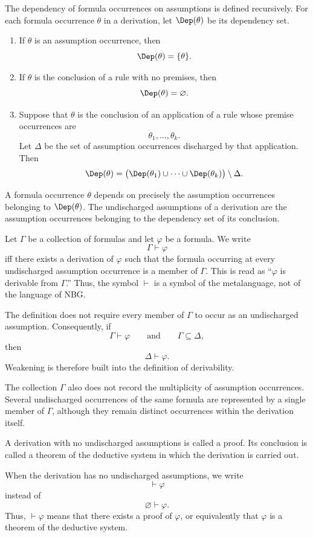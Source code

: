 The dependency of formula occurrences on assumptions is defined recursively. For each formula occurrence \(\theta\) in a derivation, let \(\Dep(\theta)\) be its dependency set.

\begin{enumerate}
    \item If \(\theta\) is an assumption occurrence, then
    \[
    \Dep(\theta)=\{\theta\}.
    \]

    \item If \(\theta\) is the conclusion of a rule with no premises, then
    \[
    \Dep(\theta)=\varnothing.
    \]

    \item Suppose that \(\theta\) is the conclusion of an application of a rule whose premise occurrences are
    \[
    \theta_1,\ldots,\theta_k.
    \]
    Let \(\Delta\) be the set of assumption occurrences discharged by that application. Then
    \[
    \Dep(\theta)
    =
    \bigl(
    \Dep(\theta_1)\cup\cdots\cup\Dep(\theta_k)
    \bigr)
    \setminus\Delta.
    \]
\end{enumerate}

A formula occurrence \(\theta\) depends on precisely the assumption occurrences belonging to \(\Dep(\theta)\). The undischarged assumptions of a derivation are the assumption occurrences belonging to the dependency set of its conclusion.

Let \(\Gamma\) be a collection of formulas and let \(\varphi\) be a formula. We write
\[
\Gamma\vdash\varphi
\]
iff there exists a derivation of \(\varphi\) such that the formula occurring at every undischarged assumption occurrence is a member of \(\Gamma\). This is read as ``\(\varphi\) is derivable from \(\Gamma\).'' Thus, the symbol \(\vdash\) is a symbol of the metalanguage, not of the language of NBG.

The definition does not require every member of \(\Gamma\) to occur as an undischarged assumption. Consequently, if
\[
\Gamma\vdash\varphi
\qquad\text{and}\qquad
\Gamma\subseteq\Delta,
\]
then
\[
\Delta\vdash\varphi.
\]
Weakening is therefore built into the definition of derivability.

The collection \(\Gamma\) also does not record the multiplicity of assumption occurrences. Several undischarged occurrences of the same formula are represented by a single member of \(\Gamma\), although they remain distinct occurrences within the derivation itself.

A derivation with no undischarged assumptions is called a proof. Its conclusion is called a theorem of the deductive system in which the derivation is carried out.

When the derivation has no undischarged assumptions, we write
\[
\vdash\varphi
\]
instead of
\[
\varnothing\vdash\varphi.
\]
Thus, \(\vdash\varphi\) means that there exists a proof of \(\varphi\), or equivalently that \(\varphi\) is a theorem of the deductive system.

\vspace{0.5cm}

